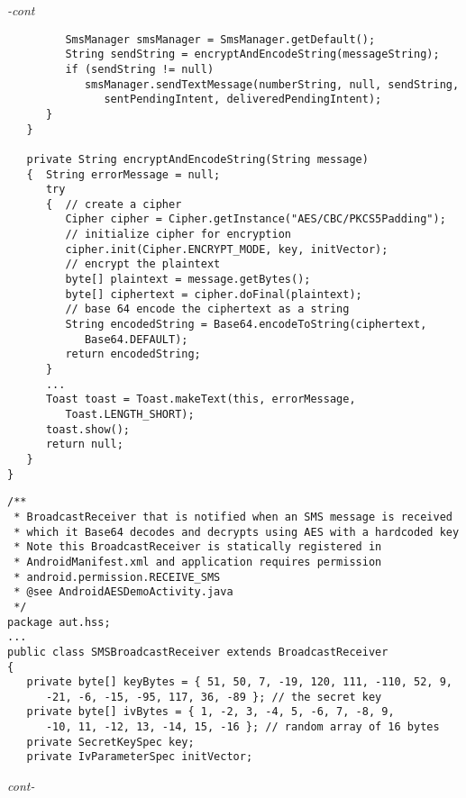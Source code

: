 \begin{figure*}\begin{program}\emph{-cont}\begin{verbatim}
         SmsManager smsManager = SmsManager.getDefault();
         String sendString = encryptAndEncodeString(messageString);
         if (sendString != null)
            smsManager.sendTextMessage(numberString, null, sendString,
               sentPendingIntent, deliveredPendingIntent);
      }
   }

   private String encryptAndEncodeString(String message)
   {  String errorMessage = null;
      try
      {  // create a cipher
         Cipher cipher = Cipher.getInstance("AES/CBC/PKCS5Padding");
         // initialize cipher for encryption
         cipher.init(Cipher.ENCRYPT_MODE, key, initVector);
         // encrypt the plaintext
         byte[] plaintext = message.getBytes();
         byte[] ciphertext = cipher.doFinal(plaintext);
         // base 64 encode the ciphertext as a string
         String encodedString = Base64.encodeToString(ciphertext,
            Base64.DEFAULT);
         return encodedString;
      }
      ...
      Toast toast = Toast.makeText(this, errorMessage,
         Toast.LENGTH_SHORT);
      toast.show();
      return null;
   }
}
\end{verbatim}\end{program}\end{figure*}
\begin{figure*}\begin{program}\begin{verbatim}
/**
 * BroadcastReceiver that is notified when an SMS message is received
 * which it Base64 decodes and decrypts using AES with a hardcoded key
 * Note this BroadcastReceiver is statically registered in
 * AndroidManifest.xml and application requires permission
 * android.permission.RECEIVE_SMS
 * @see AndroidAESDemoActivity.java
 */
package aut.hss;
...
public class SMSBroadcastReceiver extends BroadcastReceiver
{
   private byte[] keyBytes = { 51, 50, 7, -19, 120, 111, -110, 52, 9,
      -21, -6, -15, -95, 117, 36, -89 }; // the secret key
   private byte[] ivBytes = { 1, -2, 3, -4, 5, -6, 7, -8, 9,
      -10, 11, -12, 13, -14, 15, -16 }; // random array of 16 bytes
   private SecretKeySpec key;
   private IvParameterSpec initVector;
\end{verbatim}\hfill \emph{cont-}\end{program}\end{figure*}%
